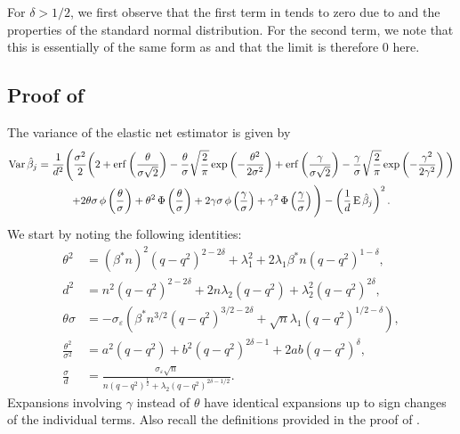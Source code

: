 For \(\delta > 1/2\), we first observe that the first term in
 tends to zero due to  and
the properties of the standard normal distribution. For the second term, we note that this
is essentially of the same form as  and that the limit is
therefore 0 here.

\subsection{Proof of }

The variance of the elastic net estimator is given by
\begin{multline}
  \label{eq:varthm-var}
  \operatorname{Var} \hat{\beta}_j = \frac{1}{d^2}\Bigg( \frac{\sigma^2}{2}\bigg(2 + \operatorname{erf}\left(\frac{\theta}{\sigma \sqrt{2}}\right) - \frac{\theta}{\sigma}\sqrt{\frac{2}{\pi}} \exp\left(-\frac{\theta^2}{2\sigma^2}\right) + \operatorname{erf}\left(\frac{\gamma}{\sigma\sqrt{2}}\right) - \frac{\gamma}{\sigma} \sqrt{\frac{2}{\pi}} \exp\left(- \frac{\gamma^2}{2\gamma^2}\right)\bigg) \\
  + 2\theta\sigma \operatorname{\phi}\left(\frac{\theta}{\sigma}\right) + \theta^2 \operatorname{\Phi}\left(\frac{\theta}{\sigma}\right) + 2\gamma \sigma \operatorname{\phi}\left(\frac{\gamma}{\sigma}\right) + \gamma^2 \operatorname{\Phi}\left(\frac{\gamma}{\sigma}\right) \Bigg)
  - \left(\frac{1}{d}\operatorname{E} \hat{\beta}_j\right)^2.
\end{multline}
We start by noting the following identities:
\[
  \begin{aligned}
    \theta^2                  & = \left(\beta^* n\right)^2 (q-q^2)^{2-2\delta} + \lambda_1^2 + 2\lambda_1 \beta^* n(q-q^2)^{1-\delta},                \\
    d^2                       & = n^2(q -q^2)^{2 - 2\delta} + 2n\lambda_2 (q-q^2) + \lambda_2^2 (q-q^2)^{2\delta},                                    \\
    \theta \sigma             & =  -\sigma_\varepsilon\left(\beta^* n^{3/2}(q- q^2)^{3/2-2\delta} + \sqrt{n} \lambda_1 (q-q^2)^{1/2 - \delta}\right), \\
    \frac{\theta^2}{\sigma^2} & = a^2(q-q^2) + b^2(q-q^2)^{2\delta - 1} + 2ab (q -q^2)^\delta,                                                        \\
    \frac{\sigma}{d}          & = \frac{\sigma_\varepsilon \sqrt{n}}{n(q-q^2)^\frac{1}{2} + \lambda_2 (q-q^2)^{2\delta - 1/2}}.
  \end{aligned}
\]
Expansions involving \(\gamma\) instead of \(\theta\) have identical expansions up to sign
changes of the individual terms. Also recall the definitions provided in the proof of
.

